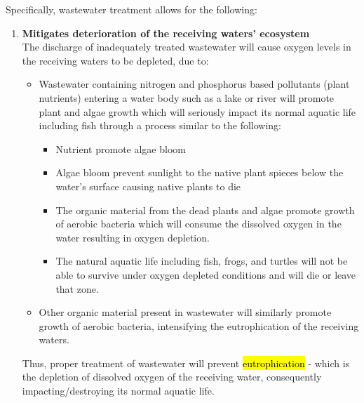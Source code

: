Specifically, wastewater treatment allows for the following:

\begin{enumerate}
\item \textbf{Mitigates deterioration of the receiving waters' ecosystem }\\
The discharge of inadequately treated wastewater will cause oxygen levels in the receiving waters to be depleted, due to:

\begin{itemize}

\item Wastewater containing nitrogen and phosphorus based pollutants (plant nutrients) entering a water body such as a lake or river will promote plant and algae growth which will seriously impact its normal aquatic life including fish through a process similar to the following:

\begin{itemize}
\item Nutrient promote algae bloom
\item Algae bloom prevent sunlight to the native plant spieces below the water's surface causing native plants to die
\item The organic material from the dead plants and algae promote growth of aerobic bacteria which will consume the dissolved oxygen in the water resulting in oxygen depletion.
\item The natural aquatic life including fish, frogs, and turtles will not be able to survive under oxygen depleted conditions and will die or leave that zone.
\end{itemize}
\item Other organic material present in wastewater will similarly promote growth of aerobic bacteria, intensifying the eutrophication of the receiving waters.
\end{itemize}

Thus, proper treatment of wastewater will prevent \hl{eutrophication} - which is the depletion of dissolved oxygen of the receiving water, consequently impacting/destroying its normal aquatic life.


\end{enumerate}
